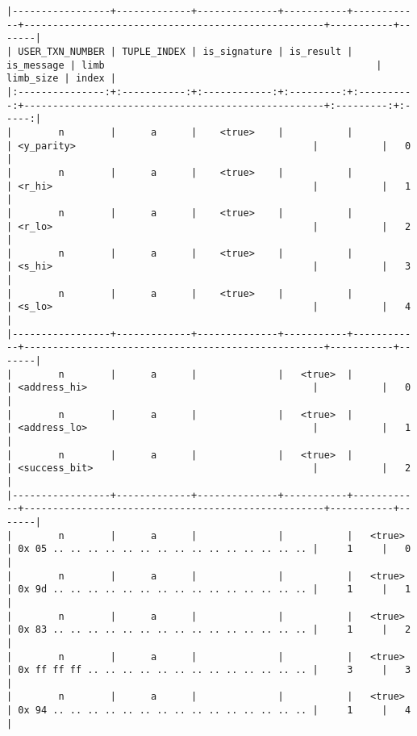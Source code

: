 \documentclass[varwidth=\maxdimen,margin=0.5cm,multi={verbatim}]{standalone}
\begin{document}
\begin{verbatim}
|-----------------+-------------+--------------+-----------+------------+----------------------------------------------------+-----------+-------|
| USER_TXN_NUMBER | TUPLE_INDEX | is_signature | is_result | is_message | limb                                               | limb_size | index |
|:---------------:+:-----------:+:------------:+:---------:+:----------:+----------------------------------------------------+:---------:+:-----:|
|        n        |      a      |    <true>    |           |            | <y_parity>                                         |           |   0   |
|        n        |      a      |    <true>    |           |            | <r_hi>                                             |           |   1   |
|        n        |      a      |    <true>    |           |            | <r_lo>                                             |           |   2   |
|        n        |      a      |    <true>    |           |            | <s_hi>                                             |           |   3   |
|        n        |      a      |    <true>    |           |            | <s_lo>                                             |           |   4   |
|-----------------+-------------+--------------+-----------+------------+----------------------------------------------------+-----------+-------|
|        n        |      a      |              |   <true>  |            | <address_hi>                                       |           |   0   |
|        n        |      a      |              |   <true>  |            | <address_lo>                                       |           |   1   |
|        n        |      a      |              |   <true>  |            | <success_bit>                                      |           |   2   |
|-----------------+-------------+--------------+-----------+------------+----------------------------------------------------+-----------+-------|
|        n        |      a      |              |           |   <true>   | 0x 05 .. .. .. .. .. .. .. .. .. .. .. .. .. .. .. |     1     |   0   |
|        n        |      a      |              |           |   <true>   | 0x 9d .. .. .. .. .. .. .. .. .. .. .. .. .. .. .. |     1     |   1   |
|        n        |      a      |              |           |   <true>   | 0x 83 .. .. .. .. .. .. .. .. .. .. .. .. .. .. .. |     1     |   2   |
|        n        |      a      |              |           |   <true>   | 0x ff ff ff .. .. .. .. .. .. .. .. .. .. .. .. .. |     3     |   3   |
|        n        |      a      |              |           |   <true>   | 0x 94 .. .. .. .. .. .. .. .. .. .. .. .. .. .. .. |     1     |   4   |

\end{verbatim}
\end{document}

